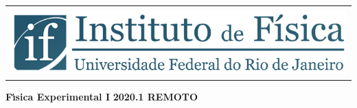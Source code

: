 \begin{titlepage}

\begin{center}
\begin{tabular}{@{}l}
\mbox{}\\[1mm]       
\hspace{0.8cm}
\includegraphics[width=14cm]{fig/logoiftop.jpg}
\end{tabular}%
%
\vskip 3.5cm
{\bf  \Huge F\'\i sica Experimental I}
\vskip 0.2cm
\vskip 7cm
{\bf \Large   2020.1 REMOTO}

\end{center}

\end{titlepage}


